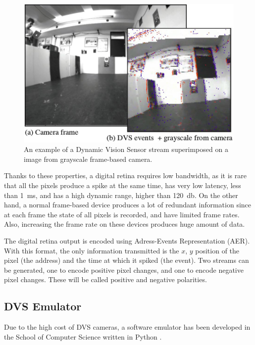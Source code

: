 \begin{figure}[ht]
\centering
\captionsetup{width=0.75\linewidth}
\includegraphics[scale=0.4]{images/context/dvs.jpg}
\caption[DVS comparison to frame-based device]{An example of a Dynamic Vision Sensor stream superimposed on a image from grayscale frame-based camera.}
\label{fig:dvs}
\end{figure}

Thanks to these properties, a digital retina requires low bandwidth, as it is rare that all the pixels produce a spike at the same time, has very low latency, less than \SI{1}{\milli\second}, and has a high dynamic range, higher than \SI{120}{\decibel}. On the other hand, a normal frame-based device produces a lot of redundant information since at each frame the state of all pixels is recorded, and have limited frame rates. Also, increasing the frame rate on these devices produces huge amount of data.

The digital retina output is encoded using Adress-Events Representation (AER). With this format, the only information transmitted is the $x$, $y$ position of the pixel (the address) and the time at which it spiked (the event). Two streams can be generated, one to encode positive pixel changes, and one to encode negative pixel changes. These will be called positive and negative polarities.  


\subsection{DVS Emulator}
Due to the high cost of DVS cameras, a software emulator has been developed in the School of Computer Science written in Python \cite{Garcia2017}.


